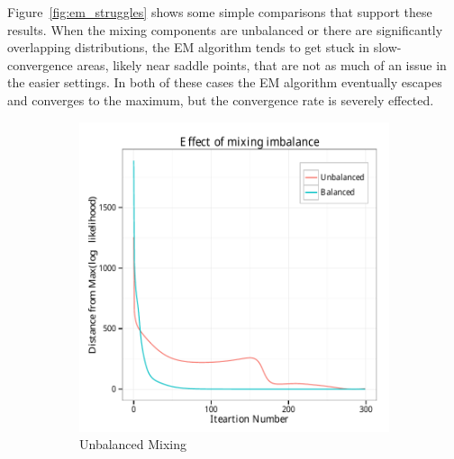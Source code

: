 \documentclass{article}
\theoremstyle{definition}
\theoremstyle{algodesc}
\begin{document}
Figure~\ref{fig:em_struggles} shows some simple comparisons that support these results. When the mixing components are unbalanced or there are significantly overlapping distributions, the EM algorithm tends to get stuck in slow-convergence areas, likely near saddle points, that are not as much of an issue in the easier settings. In both of these cases the EM algorithm eventually escapes and converges to the maximum, but the convergence rate is severely effected.

\begin{figure}[htb] \centering
  \begin{subfigure}[t]{.49\linewidth}
    \includegraphics[width=\linewidth]{include/unbal_mix.pdf}
    \caption{Unbalanced Mixing} \label{fig:em_struggles_unbal}
  \end{subfigure}
  \begin{subfigure}[t]{.49\linewidth}

\end{subfigure}
\end{figure}
\end{document}
